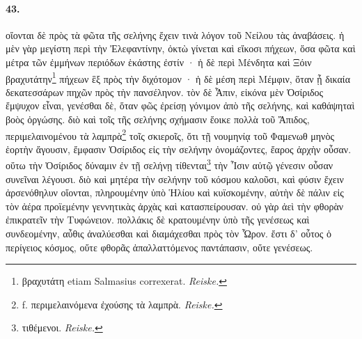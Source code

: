 \documentclass[a4paper, 11pt, oneside, polutonikogreek, german, landscape]{article}
\begin{document}
\paragraph{43.}
οἴονται δὲ πρὸς τὰ φῶτα τῆς σελήνης ἔχειν τινὰ λόγον τοῦ Νείλου τὰς ἀναβάσεις. ἡ μὲν γὰρ μεγίστη περὶ τὴν Ἐλεφαντίνην, ὀκτὼ γίνεται καὶ εἴκοσι πήχεων, ὅσα φῶτα καὶ μέτρα τῶν ἐμμήνων περιόδων ἑκάστης ἐστίν · ἡ δὲ περὶ Μένδητα καὶ Ξόιν βραχυτάτην\footnote{βραχυτάτη etiam Salmasius correxerat. \emph{Reiske.}} πήχεων ἓξ πρὸς τὴν διχότομον · ἡ δὲ μέση περὶ Μέμφιν, ὅταν ᾖ δικαία δεκατεσσάρων πηχῶν πρὸς τὴν πανσέληνον. τὸν δὲ Ἆπιν, εἰκόνα μὲν Ὀσίριδος ἔμψυχον εἶναι, γενέσθαι δὲ, ὅταν φῶς ἐρείσῃ γόνιμον ἀπὸ τῆς σελήνης, καὶ καθάψηταὶ βοὸς ὀργώσης. διὸ καὶ τοῖς τῆς σελήνης σχήμασιν ἔοικε πολλὰ τοῦ Ἄπιδος, περιμελαινομένου τὰ λαμπρὰ\footnote{f. περιμελαινόμενα ἐχούσης τὰ λαμπρὰ. \emph{Reiske.}} τοῖς σκιεροῖς, ὅτι τῇ νουμηνίᾳ τοῦ Φαμενωθ μηνὸς ἑορτὴν ἄγουσιν, ἔμφασιν Ὀσίριδος εἰς τὴν σελήνην ὀνομάζοντες, ἔαρος ἀρχὴν οὖσαν. οὕτω τὴν Ὀσίριδος δύναμιν ἐν τῇ σελήνῃ τίθενται\footnote{τιθέμενοι. \emph{Reiske.}} τὴν Ἶσιν αὐτῷ γένεσιν οὖσαν συνεῖναι λέγουσι. διὸ καὶ μητέρα τὴν σελήνην τοῦ κόσμου καλοῦσι, καὶ φύσιν ἔχειν ἀρσενόθηλυν οἴονται, πληρουμένην ὑπὸ Ἡλίου καὶ κυϊσκομένην, αὐτὴν δὲ πάλιν εἰς τὸν ἀέρα προϊεμένην γεννητικὰς ἀρχὰς καὶ κατασπείρουσαν. οὐ γὰρ ἀεὶ τὴν φθορὰν ἐπικρατεῖν τὴν Τυφώνειον. πολλάκις δὲ κρατουμένην ὑπὸ τῆς γενέσεως καὶ συνδεομένην, αὖθις ἀναλύεσθαι καὶ διαμάχεσθαι πρὸς τὸν Ὧρον. ἔστι δ' οὗτος ὁ περίγειος κόσμος, οὔτε φθορᾶς ἀπαλλαττόμενος παντάπασιν, οὔτε γενέσεως.
\end{document}
